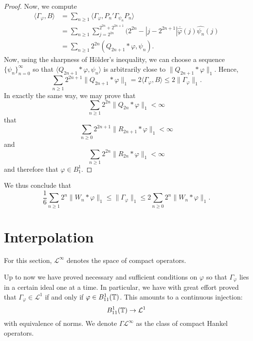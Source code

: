 \begin{proof}
    Now, we compute
    \begin{align*}
        \langle \Gamma_\varphi,B \rangle &= \sum_{n\geq 1} \langle \Gamma_\varphi,P_n'\Gamma_{\psi_n}P_n\rangle\\
        &= \sum_{n\geq 1} \sum_{j=2^{2n}}^{2^{2n}+2^{2n+1}}(2^{2n}-|j-2^{2n+1}|\overline{\widehat{\varphi}}(j)\widehat{\psi_n}(j)\\
        &= \sum_{n\geq 1} 2^{2n} (Q_{2n+1}*\varphi,\psi_n).
    \end{align*}
    Now, using the sharpness of H\"older's inequality, we can choose
    a sequence $\{\psi_n\}_{n=0}^\infty$ so that $\langle Q_{2n+1}*\varphi,\psi_n\rangle$
    is arbitrarily close to $\|Q_{2n+1}*\varphi\|_1$. Hence,
    \begin{equation*}
        \sum_{n\geq 1}2^{2n+1}\|Q_{2n+1}*\varphi\|_1 = 2\langle \Gamma_\varphi,B\rangle \leq 2\|\Gamma_\varphi\|_1.
    \end{equation*}
    In exactly the same way, we may prove that
    \begin{equation*}
        \sum_{n\geq 1}2^{2n}\|Q_{2n}*\varphi\|_1 < \infty
    \end{equation*} 
    that
    \begin{equation*}
        \sum_{n\geq 0} 2^{2n+1} \|R_{2n+1}*\varphi\|_1 < \infty
    \end{equation*}
    and
    \begin{equation*}
        \sum_{n\geq 1} 2^{2n}\|R_{2n}*\varphi\|_1 < \infty
    \end{equation*}
    and therefore that $\varphi \in B_1^1$.
\end{proof} 

\begin{remark}
    We thus conclude that
    \begin{equation*}
        \frac{1}{6}\sum_{n\geq 1}2^n \|W_n*\varphi\|_1 \leq \|\Gamma_\varphi\|_1 \leq 2\sum_{n\geq 0} 2^n\|W_n*\varphi\|_1.
    \end{equation*}
\end{remark}

\section{Interpolation}
For this section, $\mathcal{L}^\infty$ denotes the space of compact operators.

Up to now we have proved necessary and sufficient conditions
on $\varphi$ so that $\Gamma_\varphi$ lies in a certain ideal one at a time.
In particular, we have with great effort proved that $\Gamma_\varphi \in \mathcal{L}^1$
if and only if $\varphi \in B_{11}^1(\mathbb{T})$.
This amounts to a continuous
injection:
\begin{equation}
\label{emb1}
    B_{11}^1(\Circ) \to \mathcal{L}^1
\end{equation}
with equivalence of norms.
We denote $\Gamma\mathcal{L}^\infty$
as the class of compact Hankel operators.

